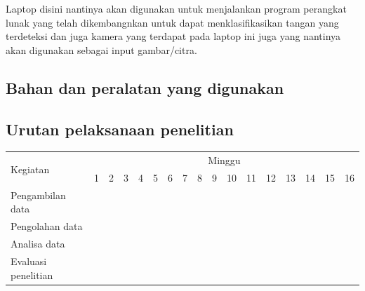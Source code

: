 Laptop disini nantinya akan digunakan untuk menjalankan program perangkat lunak yang telah dikembangnkan untuk dapat menklasifikasikan tangan yang terdeteksi dan juga kamera yang terdapat pada laptop ini juga yang nantinya akan digunakan sebagai input gambar/citra. 



\subsection{Bahan dan peralatan yang digunakan}

\lipsum[13]
\lipsum[3]

\subsection{Urutan pelaksanaan penelitian}

\newcommand{\w}{}
\newcommand{\G}{\cellcolor{gray}}
\begin{table}[h!]
  \begin{tabular}{|p{3.5cm}|c|c|c|c|c|c|c|c|c|c|c|c|c|c|c|c|}

    \hline
    \multirow{2}{*}{Kegiatan} & \multicolumn{16}{|c|}{Minggu} \\
    \cline{2-17} &
    1 & 2 & 3 & 4 & 5 & 6 & 7 & 8 & 9 & 10 & 11 & 12 & 13 & 14 & 15 & 16 \\
    \hline

    Pengambilan data &
    \G & \G & \G & \G & \w & \w & \w & \w & \w & \w & \w & \w & \w & \w & \w & \w \\
    \hline

    Pengolahan data &
    \w & \w & \w & \w & \G & \G & \G & \G & \w & \w & \w & \w & \w & \w & \w & \w \\
    \hline

    Analisa data &
    \w & \w & \w & \w & \w & \w & \w & \w & \G & \G & \G & \G & \w & \w & \w & \w \\
    \hline

    Evaluasi penelitian &
    \w & \w & \w & \w & \w & \w & \w & \w & \w & \w & \w & \w & \G & \G & \G & \G \\
    \hline

  \end{tabular}
\end{table}
